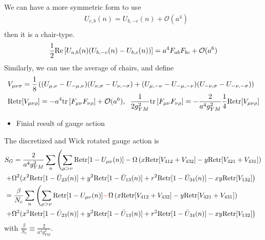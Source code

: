 We can have a more symmetric form to use
\begin{equation}
\begin{split}
&U_{c,b}(n)=U_{b,-c}(n)+\mathcal{O}(a^4)\\
\end{split}
\end{equation}
then it is a chair-type.
\begin{equation}
\begin{split}
&\frac{1}{2}{\rm Re}\left[U_{a,b}(n)(U_{b,-c}(n)-U_{b,c}(n))\right]=a^4F_{ab}F_{bc}+\mathcal{O}(a^6)\\
\end{split}
\end{equation}
Similarly, we can use the average of chairs, and define
\begin{equation}
\begin{split}
&V_{\mu\nu\sigma}=\frac{1}{8}\left((U_{\mu,\nu}-U_{-\mu,\nu})(U_{\nu,\sigma}-U_{\nu,-\sigma})+(U_{\mu,-\nu}-U_{-\mu,-\nu})(U_{-\nu,\sigma}-U_{-\nu,-\sigma})\right)\\
&{\rm Retr}[V_{\mu\nu\rho}]=-a^4{\rm tr}\left[F_{\mu\nu}F_{\nu\rho}\right]+\mathcal{O}(a^6),\;\;\frac{1}{2g_{YM}^2}{\rm tr}\left[F_{\mu\nu}F_{\nu\rho}\right]=-\frac{2}{a^4g_{YM}^2}\frac{1}{4}{\rm Retr}[V_{\mu\nu\rho}]\\
\end{split}
\end{equation}

\begin{itemize}
  \item Finial result of gauge action
\end{itemize}

The discretized and Wick rotated gauge action is
\begin{equation}
\begin{split}
&S_G=\frac{2}{a^4g_{YM}^2}\sum _{n}\left(\sum _{\mu >\nu}{\rm Retr}[1-U_{\mu\nu}(n)]-\Omega\left(x{\rm Retr}[V_{412}+V_{432}]-y{\rm Retr}[V_{421}+V_{431}]\right)\right.\\
&\left.+\Omega^2(x^2{\rm Retr}[1-\bar{U}_{23}(n)]+y^2{\rm Retr}[1-\bar{U}_{13}(n)]+r^2{\rm Retr}[1-\bar{U}_{34}(n)]-xy{\rm Retr}[V_{132}]\right)\\
&=\frac{\beta}{N_c}\sum _{n}\left(\sum _{\mu >\nu}{\rm Retr}[1-U_{\mu\nu}(n)]\textcolor[rgb]{1,0,0}{-}\Omega\left(x{\rm Retr}[V_{412}+V_{432}]-y{\rm Retr}[V_{421}+V_{431}]\right)\right.\\
&\left.+\Omega^2(x^2{\rm Retr}[1-\bar{U}_{23}(n)]+y^2{\rm Retr}[1-\bar{U}_{13}(n)]+r^2{\rm Retr}[1-\bar{U}_{34}(n)]-xy{\rm Retr}[V_{132}]\right)\\
\end{split}
\end{equation}
with $\frac{\beta}{N_c} \equiv \frac{2}{a^4g_{YM}^2}$.

